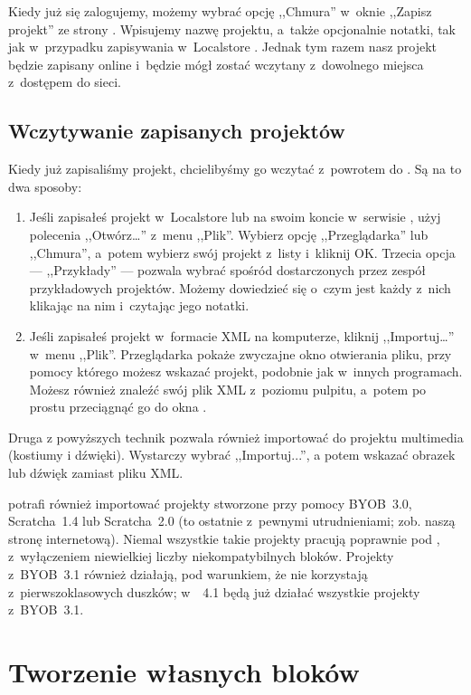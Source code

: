 \documentclass[a4paper]{report}
\begin{document}
Kiedy już się zalogujemy, możemy wybrać opcję ,,Chmura'' w~oknie ,,Zapisz projekt'' ze strony . Wpisujemy nazwę projektu, a~także opcjonalnie notatki, tak jak w~przypadku zapisywania w~Localstore . Jednak tym razem nasz projekt będzie zapisany online i~będzie mógł zostać wczytany z~dowolnego miejsca z~dostępem do sieci.

\section{Wczytywanie zapisanych projektów}

Kiedy już zapisaliśmy projekt, chcielibyśmy go wczytać z~powrotem do . Są na to dwa sposoby:

\begin{enumerate}
\item Jeśli zapisałeś projekt w~Localstore  lub na swoim koncie w~serwisie \Snap{}, użyj polecenia ,,Otwórz\ldots'' z~menu ,,Plik''. Wybierz opcję ,,Przeglądarka'' lub ,,Chmura'', a~potem wybierz swój projekt z~listy i~kliknij OK. Trzecia opcja --- ,,Przykłady'' --- pozwala wybrać spośród dostarczonych przez zespół  przykładowych projektów. Możemy dowiedzieć się o~czym jest każdy z~nich klikając na nim i~czytając jego notatki.

\item Jeśli zapisałeś projekt w~formacie XML na komputerze, kliknij ,,Importuj\ldots'' w~menu ,,Plik''. Przeglądarka pokaże zwyczajne okno otwierania pliku, przy pomocy którego możesz wskazać projekt, podobnie jak w~innych programach. Możesz również znaleźć swój plik XML z~poziomu pulpitu, a~potem po prostu przeciągnąć go do okna .
\end{enumerate}

Druga z powyższych technik pozwala również importować do projektu multimedia (kostiumy i dźwięki). Wystarczy wybrać ,,Importuj...'', a potem wskazać obrazek lub dźwięk zamiast pliku XML.

\Snap{} potrafi również importować projekty stworzone przy pomocy BYOB~3.0, Scratcha~1.4 lub Scratcha~2.0 (to ostatnie z~pewnymi utrudnieniami; zob. naszą stronę internetową). Niemal wszystkie takie projekty pracują poprawnie pod , z~wyłączeniem niewielkiej liczby niekompatybilnych bloków. Projekty z~BYOB~3.1 również działają, pod warunkiem, że nie korzystają z~pierwszoklasowych duszków; w~~4.1 będą już działać wszystkie projekty z~BYOB~3.1.

\chapter{Tworzenie własnych bloków}
\end{document}
